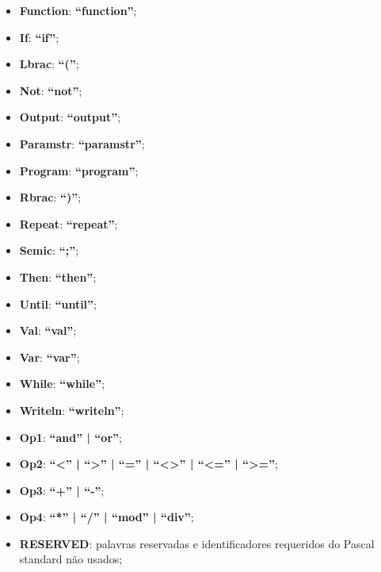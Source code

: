 \documentclass[12pt]{article}
\begin{document}
\begin{itemize}
\item \textbf{Function}: \textbf{``function''};

\item \textbf{If}: \textbf{``if''};

\item \textbf{Lbrac}: \textbf{``(''};

\item \textbf{Not}: \textbf{``not''};

\item \textbf{Output}: \textbf{``output''};

\item \textbf{Paramstr}: \textbf{``paramstr''};

\item \textbf{Program}: \textbf{``program''};

\item \textbf{Rbrac}: \textbf{``)''};

\item \textbf{Repeat}: \textbf{``repeat''};

\item \textbf{Semic}: \textbf{``;''};

\item \textbf{Then}: \textbf{``then''};

\item \textbf{Until}: \textbf{``until''};

\item \textbf{Val}: \textbf{``val''};

\item \textbf{Var}: \textbf{``var''};

\item \textbf{While}: \textbf{``while''};

\item \textbf{Writeln}: \textbf{``writeln''};

\item \textbf{Op1}: \textbf{``and'' | ``or''};

\item \textbf{Op2}: \textbf{``<'' | ``>'' | ``='' | ``<>'' | ``<='' | ``>=''};

\item \textbf{Op3}: \textbf{``+'' | ``-''};

\item \textbf{Op4}: \textbf{``*'' | ``/'' | ``mod'' | ``div''};

\item \textbf{RESERVED}: palavras reservadas e identificadores requeridos do Pascal standard não usados;

\end{itemize}
\end{document}
